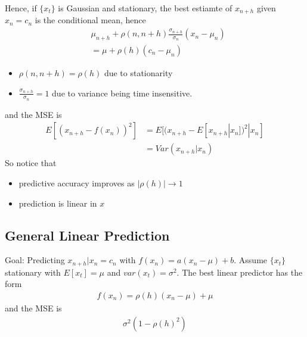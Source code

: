 Hence, if $\{x_t\}$ is Gaussian and stationary, the best estiamte of $x_{n+h}$ given $x_n = c_n$ is the conditional mean, hence 
    \begin{align*}
        & \mu_{n+h} + \rho(n, n+h) \frac{\sigma_{n+h}}{\sigma_n} (x_n - \mu_n)\\
        & = \mu + \rho(h)(c_n - \mu_n)
    \end{align*}
    \begin{itemize}
        \item $\rho(n, n+h) = \rho(h)$ due to stationarity 
        \item $\frac{\sigma_{n+h}}{\sigma_n} = 1$ due to variance being time insensitive. 
    \end{itemize}
and the MSE is 
    \begin{align*}
        E[(x_{n+h} - f(x_n))^2] 
        & =  E[(x_{n+h} - E[x_{n+h}|x_n])^2 |x_n] \\
        & = Var(x_{n+h}|x_n)
    \end{align*}
So notice that 
    \begin{itemize}
        \item predictive accuracy improves as $|\rho(h)|\rightarrow 1$
        \item prediction is linear in $x$
    \end{itemize}
    
\subsection{General Linear Prediction}
Goal: Predicting $x_{n+h}|x_n = c_n$ with $f(x_n)=a(x_n-\mu)+b$. Assume $\{x_t\}$ stationary with $E[x_t]=\mu$ and $var(x_t)=\sigma^2$. The best linear predictor has the form 
    \begin{align*}
        f(x_n) = \rho(h) (x_n - \mu) + \mu
    \end{align*}
and the MSE is 
    \begin{align*}
        \sigma^2(1 - \rho(h)^2)
    \end{align*}